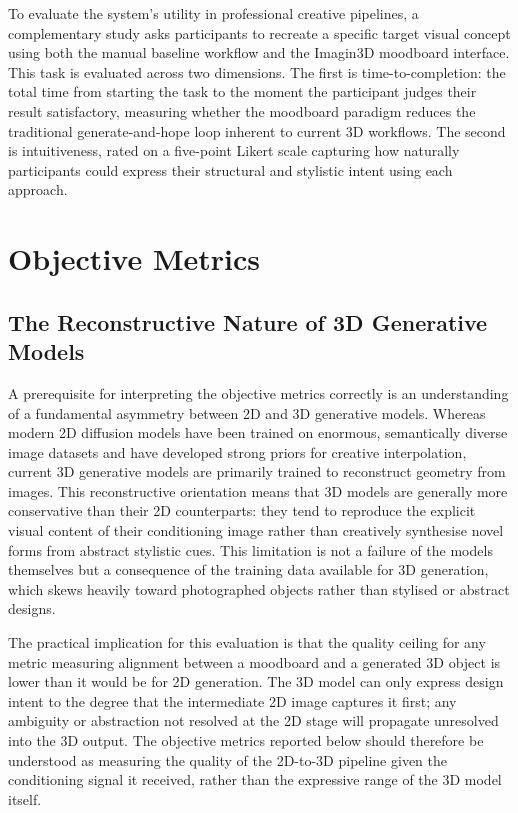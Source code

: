 To evaluate the system's utility in professional creative pipelines, a complementary study asks participants to recreate a specific target visual concept using both the manual baseline workflow and the Imagin3D moodboard interface. This task is evaluated across two dimensions. The first is time-to-completion: the total time from starting the task to the moment the participant judges their result satisfactory, measuring whether the moodboard paradigm reduces the traditional generate-and-hope loop inherent to current 3D workflows. The second is intuitiveness, rated on a five-point Likert scale capturing how naturally participants could express their structural and stylistic intent using each approach.

\section{Objective Metrics}

\subsection{The Reconstructive Nature of 3D Generative Models}

A prerequisite for interpreting the objective metrics correctly is an understanding of a fundamental asymmetry between 2D and 3D generative models. Whereas modern 2D diffusion models have been trained on enormous, semantically diverse image datasets and have developed strong priors for creative interpolation, current 3D generative models are primarily trained to reconstruct geometry from images. This reconstructive orientation means that 3D models are generally more conservative than their 2D counterparts: they tend to reproduce the explicit visual content of their conditioning image rather than creatively synthesise novel forms from abstract stylistic cues. This limitation is not a failure of the models themselves but a consequence of the training data available for 3D generation, which skews heavily toward photographed objects rather than stylised or abstract designs.

The practical implication for this evaluation is that the quality ceiling for any metric measuring alignment between a moodboard and a generated 3D object is lower than it would be for 2D generation. The 3D model can only express design intent to the degree that the intermediate 2D image captures it first; any ambiguity or abstraction not resolved at the 2D stage will propagate unresolved into the 3D output. The objective metrics reported below should therefore be understood as measuring the quality of the 2D-to-3D pipeline given the conditioning signal it received, rather than the expressive range of the 3D model itself.

